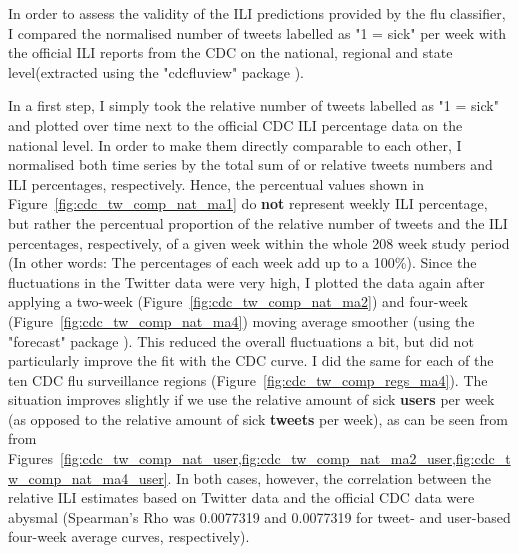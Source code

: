 \documentclass[11pt, a4paper]{report}\usepackage[]{graphicx}\usepackage[]{color}
\begin{document}
In order to assess the validity of the ILI predictions provided by the flu classifier, I compared the normalised number of tweets labelled as "1 = sick" per week with the official ILI reports from the CDC on the national, regional and state level(extracted using the "cdcfluview" package ).\newline

In a first step, I simply took the relative number of tweets labelled as "1 = sick" and plotted over time next to the official CDC ILI percentage data on the national level. In order to make them directly comparable to each other, I normalised both time series by the total sum of or relative tweets numbers and ILI percentages, respectively. Hence, the percentual values shown in Figure~\ref{fig:cdc_tw_comp_nat_ma1} do \textbf{not} represent weekly ILI percentage, but rather the percentual proportion of the relative number of tweets and the ILI percentages, respectively, of a given week within the whole 208 week study period (In other words: The percentages of each week add up to a 100\%). Since the fluctuations in the Twitter data were very high, I plotted the data again after applying a two-week (Figure~\ref{fig:cdc_tw_comp_nat_ma2}) and four-week (Figure~\ref{fig:cdc_tw_comp_nat_ma4}) moving average smoother (using the "forecast" package ). This reduced the overall fluctuations a bit, but did not particularly improve the fit with the CDC curve. I did the same for each of the ten CDC flu surveillance regions (Figure~\ref{fig:cdc_tw_comp_regs_ma4}). The situation improves slightly if we use the relative amount of sick \textbf{users} per week (as opposed to the relative amount of sick \textbf{tweets} per week), as can be seen from from Figures~\ref{fig:cdc_tw_comp_nat_user,fig:cdc_tw_comp_nat_ma2_user,fig:cdc_tw_comp_nat_ma4_user}. In both cases, however, the correlation between the relative ILI estimates based on Twitter data and the official CDC data were abysmal (Spearman's Rho was 0.0077319 and 0.0077319 for tweet- and user-based four-week average curves, respectively).\newline 
\end{document}
